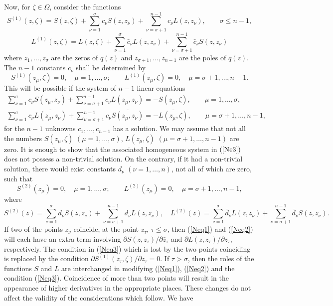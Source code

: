\documentclass[11pt, reqno]{amsart}
\numberwithin{equation}{section}
\newcommand{\Om}{\Omega}
\begin{document}
\medskip

Now, for $\zeta\in\Om$, consider the functions
\begin{equation}\label{Neq1}
	S^{(1)}(z,\zeta) = S(z,\zeta) + \sum_{\nu=1}^\sigma c_{\nu} S(z,z_{\nu}) + \sum_{\nu = \sigma +1}^{n-1} c_{\nu} L(z,z_{\nu}),
	\quad\quad \sigma\leq n-1,
\end{equation}
\begin{equation}\label{Neq2}
	L^{(1)}(z,\zeta) = L(z,\zeta) + \sum_{\nu=1}^\sigma \bar{c}_{\nu} L(z,z_{\nu}) + \sum_{\nu = \sigma +1}^{n-1} \bar{c}_{\nu} S(z,z_{\nu})
\end{equation}
where $z_1,\ldots,z_{\sigma}$ are the zeros of $q(z)$ and $z_{\sigma+1},\ldots,z_{n-1}$ are the poles of $q(z)$. The $n-1$ constants $c_{\nu}$ shall be determined by
\begin{equation}\label{Neq3}
	S^{(1)}(z_{\mu},\zeta) = 0, \quad \mu =1,\ldots, \sigma;
	\quad\quad
	L^{(1)}(z_{\mu}, \zeta) = 0, \quad \mu = \sigma+1,\ldots,n-1.
\end{equation}
This will be possible if the system of $n-1$ linear equations
\begin{multline}\label{Ne3}
	\sum_{\nu=1}^\sigma c_{\nu} S(z_{\mu},z_{\nu}) + \sum_{\nu = \sigma +1}^{n-1} c_{\nu} L(z_{\mu},z_{\nu})
	=
	-S(z_{\mu},\zeta),
	\quad\quad \mu = 1,\ldots,\sigma,
	\\
	\sum_{\nu=1}^\sigma c_{\nu} \overline{L(z_{\mu},z_{\nu})} + \sum_{\nu = \sigma +1}^{n-1} c_{\nu} \overline{S(z_{\mu},z_{\nu})} 
	=
	-\overline{L(z_{\mu},\zeta)},
	\quad\quad \mu = \sigma+1,\ldots,n-1,
\end{multline}
for the $n-1$ unknowns $c_1,\ldots,c_{n-1}$ has a solution. We may assume that not all the numbers $S(z_{\mu}, \zeta)$ $(\mu =1,\ldots,\sigma)$, $L(z_{\mu},\zeta)$ $(\mu = \sigma+1,\ldots,n-1)$ are zero. It is enough to show that the associated homogeneous system in $(\ref{Ne3})$ does not possess a non-trivial solution. On the contrary, if it had a non-trivial solution, there would exist constants $d_{\nu}$ $(\nu=1,\ldots, n)$, not all of which are zero, such that
\[
S^{(2)}(z_{\mu}) = 0,\quad \mu =1,\ldots, \sigma;\quad\quad
L^{(2)}(z_{\mu}) = 0, \quad \mu = \sigma+1,\ldots,n-1,
\]
where
\[
S^{(2)}(z) = \sum_{\nu =1}^{\sigma} d_{\nu} S(z,z_{\nu}) + \sum_{\nu = \sigma+1}^{n-1} d_{\nu} L(z,z_{\nu}),
\quad
L^{(2)}(z) = \sum_{\nu=1}^{\sigma} \bar{d}_{\nu} L(z,z_{\nu}) + \sum_{\nu=\sigma +1}^{n-1} \bar{d}_{\nu} S(z,z_{\nu}).
\]
If two of the points $z_{\nu}$ coincide, at the point $z_{\tau}$, $\tau\leq \sigma$, then (\ref{Neq1}) and (\ref{Neq2}) will each have an extra term involving $\partial S(z,z_{\tau})/\partial \bar{z}_{\tau}$ and $\partial L(z,z_{\tau})/\partial z_{\tau}$, respectively. The condition in (\ref{Neq3}) which is lost by the two points coinciding is replaced by the condition $\partial S^{(1)}(z_{\tau}, \zeta)/\partial z_{\tau} = 0$. If $\tau > \sigma$, then the roles of the functions $S$ and $L$ are interchanged in modifying (\ref{Neq1}), (\ref{Neq2}) and the condition (\ref{Neq3}). Coincidence of more than two points will result in the appearance of higher derivatives in the appropriate places. These changes do not affect the validity of the considerations which follow. We have
\end{document}
